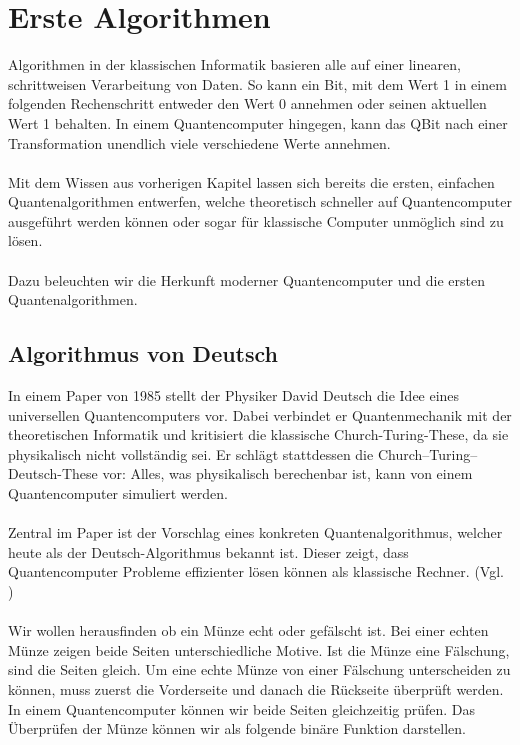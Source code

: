 



\section{Erste Algorithmen}
Algorithmen in der klassischen Informatik basieren alle auf einer linearen, schrittweisen Verarbeitung von Daten. So kann ein Bit, mit dem Wert 1 in einem folgenden Rechenschritt entweder den Wert 0 annehmen oder seinen aktuellen Wert 1 behalten. In einem Quantencomputer hingegen, kann das QBit nach einer Transformation unendlich viele verschiedene Werte annehmen.\\
\\
Mit dem Wissen aus vorherigen Kapitel lassen sich bereits die ersten, einfachen Quantenalgorithmen entwerfen, welche theoretisch schneller auf Quantencomputer ausgeführt werden können oder sogar für klassische Computer unmöglich sind zu lösen. \\
\\
Dazu beleuchten wir die Herkunft moderner Quantencomputer und die ersten Quantenalgorithmen.

\subsection{Algorithmus von Deutsch} 

In einem Paper von 1985 stellt der Physiker David Deutsch die Idee eines universellen Quantencomputers vor. Dabei verbindet er Quantenmechanik mit der theoretischen Informatik und kritisiert die klassische Church-Turing-These, da sie physikalisch nicht vollständig sei. Er schlägt stattdessen die Church–Turing–Deutsch-These vor: Alles, was physikalisch berechenbar ist, kann von einem Quantencomputer simuliert werden.\\
\\
Zentral im Paper ist der Vorschlag eines konkreten Quantenalgorithmus, welcher heute als der Deutsch-Algorithmus bekannt ist. Dieser zeigt, dass Quantencomputer Probleme effizienter lösen können als klassische Rechner.  (Vgl. \cite{deutsch_quantum_1985}) \\
\\
Wir wollen herausfinden ob ein Münze echt oder gefälscht ist. Bei einer echten Münze zeigen beide Seiten unterschiedliche Motive. Ist die Münze eine Fälschung, sind die Seiten gleich. Um eine echte Münze von einer Fälschung unterscheiden zu können, muss zuerst die Vorderseite und danach die Rückseite überprüft werden. In einem Quantencomputer können wir beide Seiten gleichzeitig prüfen. Das Überprüfen der Münze können wir als folgende binäre Funktion darstellen.

